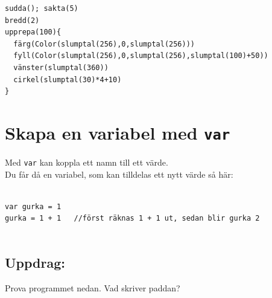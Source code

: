   

\begin{lstlisting}[basicstyle={\ttfamily\fontsize{16}{19}\selectfont},numbers=none]
sudda(); sakta(5)
bredd(2)
upprepa(100){
  färg(Color(slumptal(256),0,slumptal(256)))
  fyll(Color(slumptal(256),0,slumptal(256),slumptal(100)+50))
  vänster(slumptal(360))
  cirkel(slumptal(30)*4+10)
}
\end{lstlisting}
        
\chapter{Skapa en variabel med \lstinline{var}}Med \lstinline{var} kan koppla ett namn till ett värde.\\
Du får då en variabel, som kan tilldelas ett nytt värde så här:

\begin{lstlisting}[numbers=none]

var gurka = 1
gurka = 1 + 1   //först räknas 1 + 1 ut, sedan blir gurka 2        
        
\end{lstlisting}
        
\section*{\color{BrickRed}Uppdrag:}
Prova programmet nedan. Vad skriver paddan?

